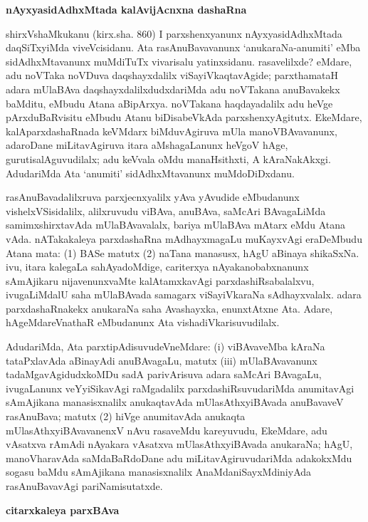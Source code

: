 \smallskip
\begin{center}
{\Large\bf nAyxyasidAdhxMtada kalAvijAcnxna dashaRna}
\end{center}

shirxVshaMkukanu (kirx.sha. 860) I parxshenxyanunx nAyxyasidAdhxMtada daqSiTxyiMda viveVcisidanu. Ata rasAnuBavavanunx `anukaraNa-anumiti' eMba sidAdhxMtavanunx muMdiTuTx vivarisalu yatinxsidanu. rasavelilxde? eMdare, adu noVTaka noVDuva daqshayxdalilx viSayiVkaqtavAgide; parxthamataH adara mUlaBAva daqshayxdalilxdudxdariMda adu noVTakana anuBavakekx baMditu, eMbudu Atana aBipArxya. noVTakana haqdayadalilx adu heVge pArxduBaRvisitu eMbudu Atanu biDisabeVkAda parxshenxyAgitutx. EkeMdare, kalAparxdashaRnada keVMdarx biMduvAgiruva mUla manoVBAvavanunx, adaroDane miLitavAgiruva itara aMshagaLanunx heVgoV hAge, gurutisalAguvudilalx; adu keVvala oMdu manaHsithxti, A kAraNakAkxgi. AdudariMda Ata `anumiti' sidAdhxMtavanunx muMdoDiDxdanu.

rasAnuBavadalilxruva parxjecnxyalilx yAva yAvudide eMbudanunx vishelxVSisidalilx, alilxruvudu viBAva, anuBAva, saMcAri BAvagaLiMda samimxshirxtavAda mUlaBAvavalalx, bariya mUlaBAva mAtarx eMdu Atana vAda. nATakakaleya parxdashaRna mAdhayxmagaLu muKayxvAgi eraDeMbudu Atana mata: (1) BASe matutx (2) naTana \hbox{manasusx}, hAgU aBinaya shikaSxNa. ivu, itara kalegaLa sahAyadoMdige, cariterxya nAyakanobabx\-nanunx sAmAjikaru nijavenunxvaMte kalAtamxkavAgi parxdashiRsabalalxvu, ivugaLiMdalU saha mUlaBAvada samagarx viSayiVkaraNa sAdhayxvalalx. adara parxdashaRnakekx anukaraNa saha Avashayxka, enunxtAtxne Ata. Adare, hAgeMdareVnathaR eMbudanunx Ata vishadiVkarisu\-vudilalx.

AdudariMda, Ata parxtipAdisuvudeVneMdare: {\rm(i)} viBAvaveMba kAraNa~ tataPxlavAda aBinayAdi anuBAvagaLu, matutx {\rm(iii)} mUlaBAvavanunx tadaMga\-vAgidudxkoMDu sadA parivArisuva adara saMcAri BAvagaLu, ivugaLanunx veYyi\-SikavAgi raMgadalilx parxdashiRsuvudariMda anumitavAgi sAmAjikana manasisxnalilx anu\-kaqtavAda mUlasAthxyiBAvada anuBavaveV rasAnuBava; matutx (2) hiVge anumita\-vAda anukaqta mUlasAthxyiBAvavanenxV nAvu rasaveMdu kareyuvudu, EkeMdare, adu vAsatxva rAmAdi nAyakara vAsatxva mUlasAthxyiBAvada anukaraNa; hAgU, manoVharavAda saMdaBaRdoDane adu miLitavAgiruvudariMda adakokxMdu sogasu baMdu sAmAjikana manasisxnalilx AnaMdaniSayxMdiniyAda rasAnuBavavAgi pariNamisutatxde.

\smallskip
\begin{center}
{\Large\bf citarxkaleya parxBAva}
\end{center}

